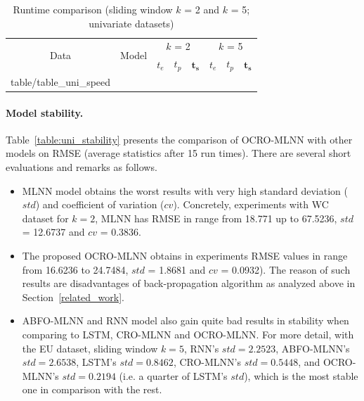 \documentclass[smallcondensed, natbib]{svjour3}     %
\makeatletter
\newcommand\primitiveinput[1]
		{\@@input #1 }
\makeatother
\begin{document}
{%
\begin{table}[!h]
	\caption{Runtime comparison (sliding window $k$ = 2 and $k$ = 5; univariate datasets)}
	\label{table:uni_speed}
	\centering
	\begin{adjustbox}{width=0.7\textwidth}
		\begin{tabular}{| c | c | c | c | c | c | c | c |}%
			\hline
			\multirow{2}{*}{Data} & \multirow{2}{*}{Model} & \multicolumn{3}{c|}{$k$ = 2} & \multicolumn{3}{c|}{ $k$ = 5 } \\ \cline{3-8}
   				& & $t_e$ & $t_p$ & $\boldsymbol{t_s}$ & $t_e$ & $t_p$ & $\boldsymbol{t_s}$  \\ [0.5ex] \hline
			\primitiveinput{table/table_uni_speed}
			\hline
		\end{tabular}
	\end{adjustbox}
\end{table}

\paragraph{\textbf{Model stability.}} Table~\ref{table:uni_stability} presents the comparison of OCRO-MLNN with other models on RMSE (average statistics after 15 run times). There are several short evaluations and remarks as follows.

\begin{itemize}
\item MLNN model obtains the worst results with very high standard deviation ($std$) and coefficient of variation ($cv$). Concretely, experiments with WC dataset for $k = 2$, MLNN has RMSE in range from 18.771 up to 67.5236, $std$ = 12.6737 and $cv$ = 0.3836.
\item The proposed OCRO-MLNN obtains in experiments RMSE values in range from 16.6236 to 24.7484, $std$ = 1.8681 and $cv$ = 0.0932). The reason of such results are disadvantages of back-propagation algorithm as analyzed above in Section~\ref{related_work}. 
\item ABFO-MLNN and RNN model also gain quite bad results in stability when comparing to LSTM, CRO-MLNN and OCRO-MLNN. For more detail, with the EU dataset, sliding window $k = 5$, RNN's $std = 2.2523$, ABFO-MLNN's $std = 2.6538$, LSTM's $std = 0.8462$, CRO-MLNN's $std = 0.5448$, and OCRO-MLNN's $std = 0.2194$ (i.e. a quarter of LSTM's $std$), which is the most stable one in comparison with the rest.
\end{itemize}

}
\end{document}
